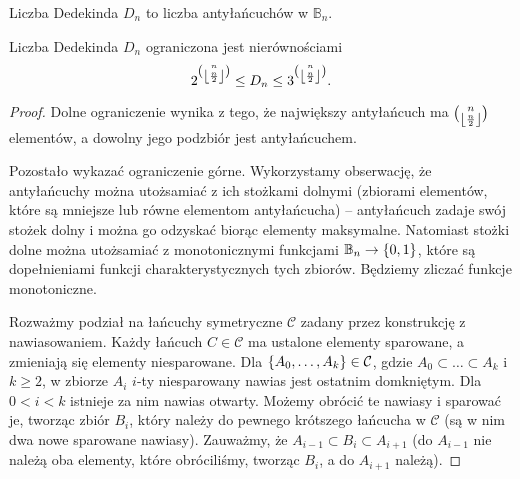 \begin{definition}
	Liczba Dedekinda \(D_n\) to liczba antyłańcuchów w \(\mathbb B_n\).
\end{definition}

\begin{theorem}
	Liczba Dedekinda \(D_n\) ograniczona jest nierównościami
	\[2^{\binom{n}{\left\lfloor\frac n2\right\rfloor}} \le D_n \le 3^{\binom{n}{\left\lfloor\frac n2\right\rfloor}}.\]
\end{theorem}
\begin{proof}
	Dolne ograniczenie wynika z tego, że największy antyłańcuch ma
	\(\binom{n}{\left\lfloor\frac n2\right\rfloor}\) elementów, a dowolny jego podzbiór jest antyłańcuchem.

	Pozostało wykazać ograniczenie górne.
	Wykorzystamy obserwację, że antyłańcuchy można utożsamiać z ich stożkami dolnymi
	(zbiorami elementów, które są mniejsze lub równe elementom antyłańcucha) --
	antyłańcuch zadaje swój stożek dolny i można go odzyskać biorąc
	elementy maksymalne. Natomiast stożki dolne można utożsamiać z monotonicznymi
	funkcjami \(\mathbb B_n \to \set{0,1}\), które są dopełnieniami funkcji
	charakterystycznych tych zbiorów. Będziemy zliczać funkcje monotoniczne.

	Rozważmy podział na łańcuchy symetryczne \(\mathcal C\) zadany przez konstrukcję
	z nawiasowaniem. Każdy łańcuch \(C\in\mathcal C\) ma ustalone elementy
	sparowane, a zmieniają się elementy niesparowane. Dla \(\set{A_0,\ldots,
		A_k}\in\mathcal C\), gdzie \(A_0\subset\ldots\subset A_k\) i \(k\ge 2\), w zbiorze
	\(A_i\) \(i\)-ty niesparowany nawias jest ostatnim domkniętym. Dla \(0<i<k\)
	istnieje za nim nawias otwarty. Możemy obrócić te nawiasy i sparować je,
	tworząc zbiór \(B_i\), który należy do pewnego krótszego łańcucha w \(\mathcal
	C\) (są w nim dwa nowe sparowane nawiasy). Zauważmy, że \(A_{i-1}\subset B_i
	\subset A_{i+1}\) (do \(A_{i-1}\) nie należą oba elementy, które obróciliśmy,
	tworząc \(B_i\), a do \(A_{i+1}\) należą).


\end{proof}

